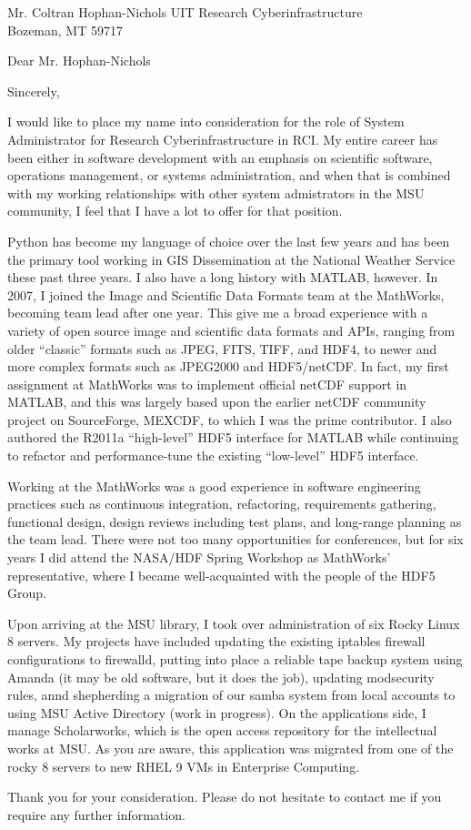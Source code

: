 \documentclass[11pt]{moderncv}  %
\begin{document}
\recipient
{Mr. Coltran Hophan-Nichols}
{UIT Research Cyberinfrastructure\\Bozeman, MT 59717}
\opening{Dear Mr. Hophan-Nichols}
\closing{Sincerely,}


\makelettertitle

I would like to place my name into consideration for the role of
System Administrator for Research Cyberinfrastructure in RCI.  My
entire career has been either in software development with an
emphasis on scientific software, operations management, or systems
administration, and when that is combined with my  working relationships
with other system admistrators in the MSU community, I feel that I
have a lot to offer for that position.


Python has become my language of choice over the last few years and has been the primary tool working in GIS Dissemination at the National Weather Service these past three years.  I also have a long history with MATLAB, however.  In 2007, I joined the Image and Scientific Data Formats team at the MathWorks, becoming  team lead after one year.  This give me a broad experience with a variety of open source image and scientific data formats and APIs, ranging from older “classic” formats such as JPEG, FITS, TIFF, and HDF4, to newer and more complex formats such as JPEG2000 and HDF5/netCDF.  In fact, my first assignment at MathWorks was to implement official netCDF support in MATLAB, and this was largely based upon the earlier netCDF community project on SourceForge, MEXCDF, to which I was the prime contributor.   I also authored the R2011a “high-level” HDF5 interface for MATLAB while continuing to refactor and performance-tune the existing “low-level” HDF5 interface.

Working at the MathWorks was a good experience in software engineering practices such as continuous integration, refactoring, requirements gathering, functional design, design reviews including test plans, and long-range planning as the team lead.   There were not too many opportunities for conferences, but for six years I did attend the NASA/HDF Spring Workshop as MathWorks’ representative, where I became well-acquainted with the people of the HDF5 Group.

Upon arriving at the MSU library, I took over administration of six Rocky Linux 8 servers.  My projects have included updating the existing iptables firewall configurations to firewalld, putting into place a reliable tape backup system using Amanda (it may be old software, but it does the job), updating modsecurity rules, annd shepherding a migration of our samba system from local accounts to using MSU Active Directory (work in progress).  On the applications side, I manage Scholarworks, which is the open access repository for the intellectual works at MSU.  As you are aware, this application was migrated from one of the rocky 8 servers to new RHEL 9 VMs in Enterprise Computing.

Thank you for your consideration.  Please do not hesitate to contact me if you require any further information.

\makeletterclosing
\end{document}
